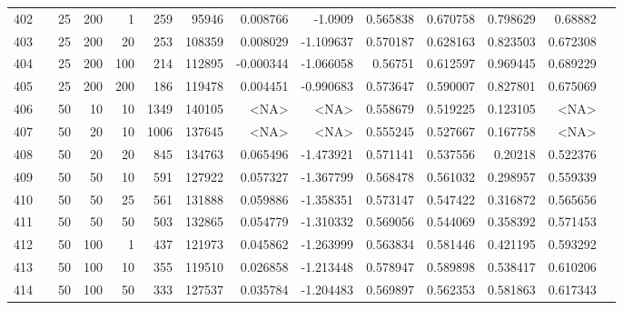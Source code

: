 \begin{longtable}{llrrrrrrrrrrrr}
		402 & &           25 &               200 &            1 &         259 &      95946 &  0.008766 &   -1.0909 &  0.565838 &    0.670758 &       0.798629 &   0.68882 \\
		403 & &           25 &               200 &           20 &         253 &     108359 &  0.008029 & -1.109637 &  0.570187 &    0.628163 &       0.823503 &  0.672308 \\
		404 & &           25 &               200 &          100 &         214 &     112895 & -0.000344 & -1.066058 &   0.56751 &    0.612597 &       0.969445 &  0.689229 \\
		405 & &           25 &               200 &          200 &         186 &     119478 &  0.004451 & -0.990683 &  0.573647 &    0.590007 &       0.827801 &  0.675069 \\
		406 & &           50 &                10 &           10 &           1349 &     140105 &      <NA> &      <NA> &  0.558679 &    0.519225 &       0.123105 &  <NA> \\
		407 & &           50 &                20 &           10 &           1006 &     137645 &      <NA> &      <NA> &  0.555245 &    0.527667 &       0.167758 &  <NA> \\
		408 & &           50 &                20 &           20 &         845 &     134763 &  0.065496 & -1.473921 &  0.571141 &    0.537556 &        0.20218 &  0.522376 \\
		409 & &           50 &                50 &           10 &         591 &     127922 &  0.057327 & -1.367799 &  0.568478 &    0.561032 &       0.298957 &  0.559339 \\
		410 & \multirow[b]{10}{*}{\rotatebox[origin=l]{90}{tfidf}} &           50 &                50 &           25 &         561 &     131888 &  0.059886 & -1.358351 &  0.573147 &    0.547422 &       0.316872 &  0.565656 \\
		411 & &           50 &                50 &           50 &         503 &     132865 &  0.054779 & -1.310332 &  0.569056 &    0.544069 &       0.358392 &  0.571453 \\
		412 & &           50 &               100 &            1 &         437 &     121973 &  0.045862 & -1.263999 &  0.563834 &    0.581446 &       0.421195 &  0.593292 \\
		413 & &           50 &               100 &           10 &         355 &     119510 &  0.026858 & -1.213448 &  0.578947 &    0.589898 &       0.538417 &  0.610206 \\
		414 & &           50 &               100 &           50 &         333 &     127537 &  0.035784 & -1.204483 &  0.569897 &    0.562353 &       0.581863 &  0.617343 \\

\end{longtable}
